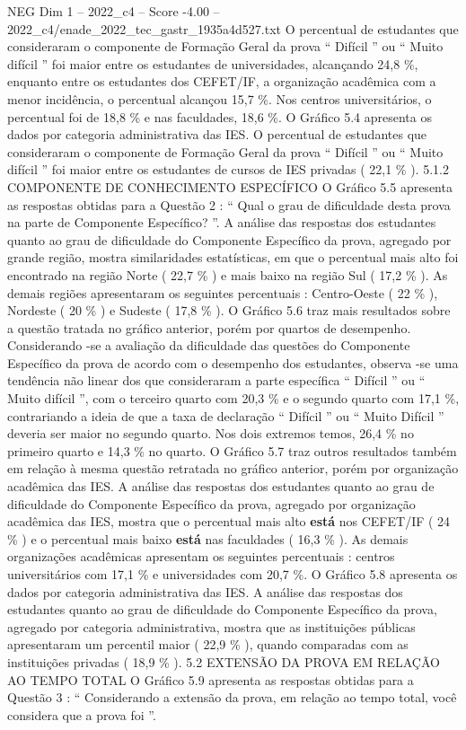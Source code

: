 \begin{textsample}{NEG Dim 1 – 2022\_c4 – Score -4.00 – 2022\_c4/enade\_2022\_tec\_gastr\_1935a4d527.txt}
O percentual de estudantes que consideraram o componente de Formação Geral da prova “ Difícil ” ou “ Muito difícil ” foi maior entre os estudantes de universidades, alcançando 24,8 \%, enquanto entre os estudantes dos CEFET/IF, a organização acadêmica com a menor incidência, o percentual alcançou 15,7 \%.
Nos centros universitários, o percentual foi de 18,8 \% e nas faculdades, 18,6 \%.
O Gráfico 5.4 apresenta os dados por categoria administrativa das IES.
O percentual de estudantes que consideraram o componente de Formação Geral da prova “ Difícil ” ou “ Muito difícil ” foi maior entre os estudantes de cursos de IES privadas ( 22,1 \% ). 5.1.2 COMPONENTE DE CONHECIMENTO ESPECÍFICO O Gráfico 5.5 apresenta as respostas obtidas para a Questão 2 : “ Qual o grau de dificuldade desta prova na parte de Componente Específico? ”.
A análise das respostas dos estudantes quanto ao grau de dificuldade do Componente Específico da prova, agregado por grande região, mostra similaridades estatísticas, em que o percentual mais alto foi encontrado na região Norte ( 22,7 \% ) e mais baixo na região Sul ( 17,2 \% ).
As demais regiões apresentaram os seguintes percentuais : Centro-Oeste ( 22 \% ), Nordeste ( 20 \% ) e Sudeste ( 17,8 \% ).
O Gráfico 5.6 traz mais resultados sobre a questão tratada no gráfico anterior, porém por quartos de desempenho.
Considerando -se a avaliação da dificuldade das questões do Componente Específico da prova de acordo com o desempenho dos estudantes, observa -se uma tendência não linear dos que consideraram a parte específica “ Difícil ” ou “ Muito difícil ”, com o terceiro quarto com 20,3 \% e o segundo quarto com 17,1 \%, contrariando a ideia de que a taxa de declaração “ Difícil ” ou “ Muito Difícil ” deveria ser maior no segundo quarto.
Nos dois extremos temos, 26,4 \% no primeiro quarto e 14,3 \% no quarto.
O Gráfico 5.7 traz outros resultados também em relação à mesma questão retratada no gráfico anterior, porém por organização acadêmica das IES.
A análise das respostas dos estudantes quanto ao grau de dificuldade do Componente Específico da prova, agregado por organização acadêmica das IES, mostra que o percentual mais alto \textbf{está} nos CEFET/IF ( 24 \% ) e o percentual mais baixo \textbf{está} nas faculdades ( 16,3 \% ).
As demais organizações acadêmicas apresentam os seguintes percentuais : centros universitários com 17,1 \% e universidades com 20,7 \%.
O Gráfico 5.8 apresenta os dados por categoria administrativa das IES.
A análise das respostas dos estudantes quanto ao grau de dificuldade do Componente Específico da prova, agregado por categoria administrativa, mostra que as instituições públicas apresentaram um percentil maior ( 22,9 \% ), quando comparadas com as instituições privadas ( 18,9 \% ). 5.2 EXTENSÃO DA PROVA EM RELAÇÃO AO TEMPO TOTAL O Gráfico 5.9 apresenta as respostas obtidas para a Questão 3 : “ Considerando a extensão da prova, em relação ao tempo total, você considera que a prova foi ”.

\end{textsample}
